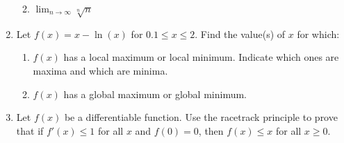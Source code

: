 \documentclass[11pt]{article}
\begin{document}
\begin{enumerate}
\begin{enumerate}
    \vfill
    
  \item $\displaystyle\lim_{n\to \infty}\sqrt[n]{n}$

    \vfill
  \end{enumerate}
  \newpage


\item Let $f(x)=x-\ln(x)$ for $0.1\leq x\leq 2$. Find the value(s) of
  $x$ for which:
  \begin{enumerate}
  \item $f(x)$ has a local maximum or local minimum. Indicate which
    ones are maxima and which are minima.

    \vfill
    
  \item $f(x)$ has a global maximum or global minimum.

    \vfill
  \end{enumerate}
  \newpage
  
\item Let $f(x)$ be a differentiable function.  Use the racetrack
  principle to prove that if $f'(x)\leq 1$ for all $x$ and $f(0)=0$,
  then $f(x)\leq x$ for all $x\geq 0$.


\end{enumerate}
\end{document}
